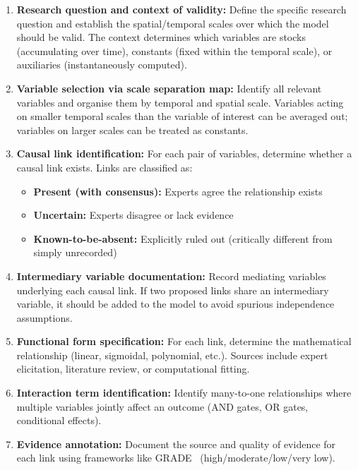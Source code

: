 \begin{enumerate}
    \item \textbf{Research question and context of validity:} Define the specific research question and establish the spatial/temporal scales over which the model should be valid. The context determines which variables are stocks (accumulating over time), constants (fixed within the temporal scale), or auxiliaries (instantaneously computed).
    \item \textbf{Variable selection via scale separation map:} Identify all relevant variables and organise them by temporal and spatial scale. Variables acting on smaller temporal scales than the variable of interest can be averaged out; variables on larger scales can be treated as constants.
    \item \textbf{Causal link identification:} For each pair of variables, determine whether a causal link exists. Links are classified as:
    \begin{itemize}
        \item \textbf{Present (with consensus):} Experts agree the relationship exists
        \item \textbf{Uncertain:} Experts disagree or lack evidence
        \item \textbf{Known-to-be-absent:} Explicitly ruled out (critically different from simply unrecorded)
    \end{itemize}
    \item \textbf{Intermediary variable documentation:} Record mediating variables underlying each causal link. If two proposed links share an intermediary variable, it should be added to the model to avoid spurious independence assumptions.
    \item \textbf{Functional form specification:} For each link, determine the mathematical relationship (linear, sigmoidal, polynomial, etc.). Sources include expert elicitation, literature review, or computational fitting.
    \item \textbf{Interaction term identification:} Identify many-to-one relationships where multiple variables jointly affect an outcome (AND gates, OR gates, conditional effects).
    \item \textbf{Evidence annotation:} Document the source and quality of evidence for each link using frameworks like GRADE~\citep{moberg2018grade} (high/moderate/low/very low).
\end{enumerate}

